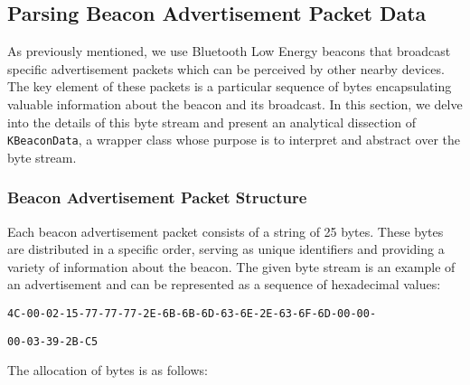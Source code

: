 \subsection{Parsing Beacon Advertisement Packet Data}

As previously mentioned, we use Bluetooth Low Energy beacons that broadcast specific advertisement packets which can be perceived by other nearby devices.
The key element of these packets is a particular sequence of bytes encapsulating valuable information about the beacon and its broadcast. 
In this section, we delve into the details of this byte stream and present an analytical dissection of \texttt{KBeaconData}, a wrapper class whose purpose is to interpret and abstract over the byte stream.

\subsubsection{Beacon Advertisement Packet Structure}
	 
Each beacon advertisement packet consists of a string of 25 bytes.
These bytes are distributed in a specific order, serving as unique identifiers and providing a variety of information about the beacon. 
The given byte stream is an example of an advertisement and can be represented as a sequence of hexadecimal values:


\noindent\texttt{4C-00-02-15-77-77-77-2E-6B-6B-6D-63-6E-2E-63-6F-6D-00-00-}


\noindent\texttt{00-03-39-2B-C5}


The allocation of bytes is as follows:


